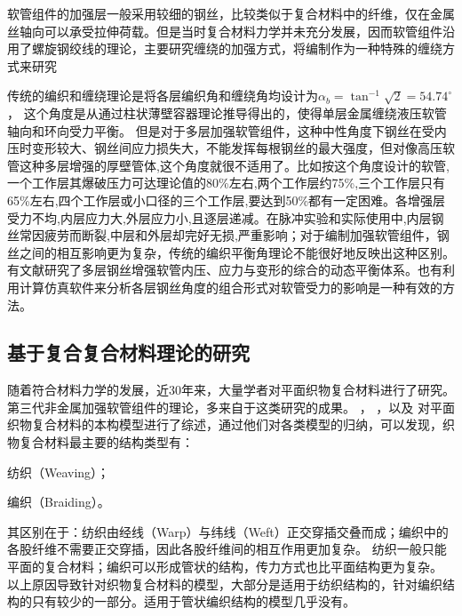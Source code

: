软管组件的加强层一般采用较细的钢丝，比较类似于复合材料中的纤维，仅在金属丝轴向可以承受拉伸荷载。但是当时复合材料力学并未充分发展，因而软管组件沿用了螺旋钢绞线的理论，主要研究缠绕的加强方式\cite{Entwistle1977,Knapp1979}，将编制作为一种特殊的缠绕方式来研究\cite{Breig1988}

传统的编织和缠绕理论是将各层编织角和缠绕角均设计为$  {\alpha _b} = {\tan ^{ - 1}}\sqrt 2  = {54.74^ \circ }$，
这个角度是从通过柱状薄壁容器理论推导得出的，使得单层金属缠绕液压软管轴向和环向受力平衡。
但是对于多层加强软管组件，这种中性角度下钢丝在受内压时变形较大、钢丝间应力损失大\cite{Evans2002}，不能发挥每根钢丝的最大强度，但对像高压软管这种多层增强的厚壁管体,这个角度就很不适用了。比如按这个角度设计的软管,一个工作层其爆破压力可达理论值的80\%左右,两个工作层约75\%,三个工作层只有65\%左右,四个工作层或小口径的三个工作层,要达到50\%都有一定困难\cite{tangxi1994}。各增强层受力不均,内层应力大,外层应力小,且逐层递减。在脉冲实验和实际使用中,内层钢丝常因疲劳而断裂,中层和外层却完好无损,严重影响；对于编制加强软管组件，钢丝之间的相互影响更为复杂，传统的编织平衡角理论不能很好地反映出这种区别。有文献研究了多层钢丝增强软管内压、应力与变形的综合的动态平衡体系\cite{tangxi1994,Evans2002}。也有利用计算仿真软件来分析各层钢丝角度的组合形式对软管受力的影响是一种有效的方法\cite{zhubowei2010}。 


\subsection{基于复合复合材料理论的研究}


随着符合材料力学的发展，近30年来，大量学者对平面织物复合材料进行了研究。第三代非金属加强软管组件的理论，多来自于这类研究的成果。
\citeauthor{Tan1997}\cite{Tan1997}，
\citeauthor{cox_handbook_1997}\cite{cox_handbook_1997}，以及
\citeauthor{ko_three-dimensional_1989}\cite{ko_three-dimensional_1989}
对平面织物复合材料的本构模型进行了综述，通过他们对各类模型的归纳，可以发现，织物复合材料最主要的结构类型有\cite{Goyal2005}：
\begin{inparaenum}[1).]
	\item 纺织（Weaving）；
	\item 编织（Braiding）。
\end{inparaenum}
其区别在于：纺织由经线（Warp）与纬线（Weft）正交穿插交叠而成；编织中的各股纤维不需要正交穿插，因此各股纤维间的相互作用更加复杂。
纺织一般只能平面的复合材料；编织可以形成管状的结构，传力方式也比平面结构更为复杂。
以上原因导致针对织物复合材料的模型，大部分是适用于纺织结构的，针对编织结构的只有较少的一部分。适用于管状编织结构的模型几乎没有\cite{Tan1997}。


